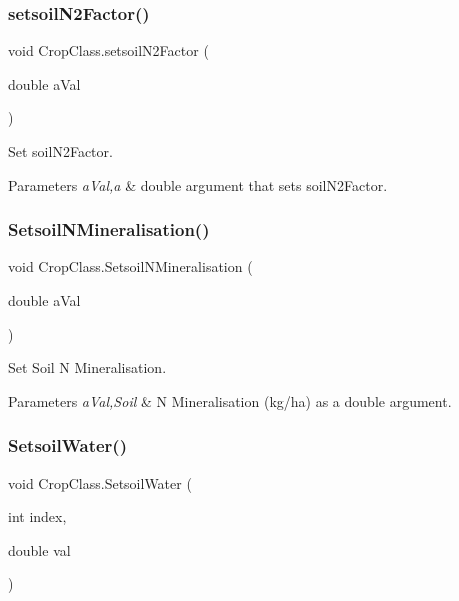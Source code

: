 \subsubsection{\texorpdfstring{setsoilN2Factor()}{setsoilN2Factor()}}
{\footnotesize\ttfamily void Crop\+Class.\+setsoil\+N2\+Factor (\begin{DoxyParamCaption}\item[{double}]{a\+Val }\end{DoxyParamCaption})\hspace{0.3cm}{\ttfamily [inline]}}



Set soil\+N2\+Factor. 


\begin{DoxyParams}{Parameters}
{\em a\+Val,a} & double argument that sets soil\+N2\+Factor. \\
\hline
\end{DoxyParams}
\mbox{\label{class_crop_class_a39217655af73655bd52ac7cad47781c0}} 
\subsubsection{\texorpdfstring{SetsoilNMineralisation()}{SetsoilNMineralisation()}}
{\footnotesize\ttfamily void Crop\+Class.\+Setsoil\+N\+Mineralisation (\begin{DoxyParamCaption}\item[{double}]{a\+Val }\end{DoxyParamCaption})\hspace{0.3cm}{\ttfamily [inline]}}



Set Soil N Mineralisation. 


\begin{DoxyParams}{Parameters}
{\em a\+Val,Soil} & N Mineralisation (kg/ha) as a double argument. \\
\hline
\end{DoxyParams}
\mbox{\label{class_crop_class_a093789f200178b78f5d396b41ec63282}} 
\subsubsection{\texorpdfstring{SetsoilWater()}{SetsoilWater()}}
{\footnotesize\ttfamily void Crop\+Class.\+Setsoil\+Water (\begin{DoxyParamCaption}\item[{int}]{index,  }\item[{double}]{val }\end{DoxyParamCaption})\hspace{0.3cm}{\ttfamily [inline]}}




